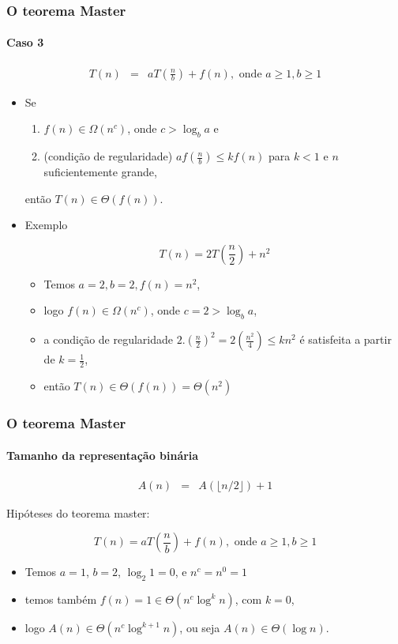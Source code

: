 \documentclass[handout]{beamer}
\begin{document}
\begin{frame}
\frametitle{O teorema Master}
\framesubtitle{Caso 3}

\begin{eqnarray*}
T(n) & = & a T(\frac{n}{b}) + f(n), \mbox{ onde $a \ge 1, b \ge 1$}
\end{eqnarray*}

\begin{itemize}

\item Se 
\begin{enumerate} 
\item $f(n) \in \Omega(n^{c})$, onde $c > \log_{b} a$ e
\item (condição de regularidade) $a f(\frac{n}{b}) \le k f(n)$ para $k < 1$ e $n$ suficientemente grande,
\end{enumerate}
então
$T(n) \in \Theta(f(n))$.

\item Exemplo

  $$T(n) = 2 T(\frac{n}{2}) + n^2$$

\pause

\begin{itemize}

\item Temos $a = 2, b = 2, f(n) = n^{2}$,

\item logo $f(n) \in \Omega(n^{c})$, onde $c = 2 > \log_b a$,

\item a condição de regularidade $2.(\frac{n}{2})^2 = 2(\frac{n^2}{4}) \le k n^2$ é satisfeita a partir de $k = \frac{1}{2}$,

\item então $T(n) \in \Theta(f(n)) = \Theta(n^2)$

\end{itemize}

\end{itemize}

\end{frame}


\begin{frame}
\frametitle{O teorema Master}
\framesubtitle{Tamanho da representação binária}

\begin{eqnarray*}
A(n) & = & A(\lfloor n/2 \rfloor) + 1
\end{eqnarray*}

Hipóteses do teorema master:

$$T(n) = a T(\frac{n}{b}) + f(n), \mbox{ onde $a \ge 1, b \ge 1$}$$

\begin{itemize}
\item Temos $a = 1$, $b = 2$, $\log_2 1 = 0$, e $n^c = n^0 = 1$
\item temos também $f(n) = 1 \in \Theta(n^c \log^k n)$, com $k = 0$, 
\item logo $A(n) \in \Theta(n^c \log^{k+1} n)$, ou seja \alert{$A(n) \in \Theta(\log n)$}.
\end{itemize}

\end{frame}
\end{document}
